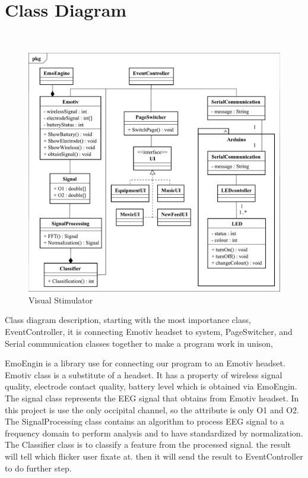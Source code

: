 \newpage
\section{Class Diagram}
\
\begin{figure}[ht]
	\centering
	\includegraphics[width=\textwidth]{chapter5/Class.pdf}
	\caption{Visual Stimulator}
\end{figure}

Class diagram description, starting with the most importance class, EventController, it is connecting Emotiv headset to system, PageSwitcher, and Serial communication classes together to make a program work in unison,

EmoEngin is a library use for connecting our program to an Emotiv headset. Emotiv class is a substitute of a headset. It has a property of wireless signal quality, electrode contact quality, battery level which is obtained via EmoEngin. The signal class represents the EEG signal that obtains from Emotiv headset. In this project is use the only occipital channel, so the attribute is only O1 and O2. The SignalProcessing class contains an algorithm to process EEG signal to a frequency domain to perform analysis and to have standardized by normalization. The Classifier class is to classify a feature from the processed signal. the result will tell which flicker user fixate at. then it will send the result to EventController to do further step.

